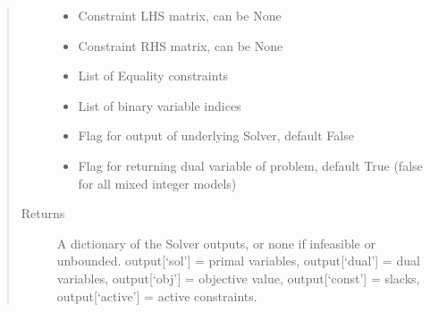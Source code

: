 \documentclass[letterpaper,10pt,english]{sphinxmanual}
\begin{document}
\begin{fulllineitems}
\begin{quote}
\begin{description}
\begin{itemize}
\item {} 
\sphinxAtStartPar
{} \textendash{} Constraint LHS matrix, can be None

\item {} 
\sphinxAtStartPar
{} \textendash{} Constraint RHS matrix, can be None

\item {} 
\sphinxAtStartPar
{} \textendash{} List of Equality constraints

\item {} 
\sphinxAtStartPar
{} \textendash{} List of binary variable indices

\item {} 
\sphinxAtStartPar
{} \textendash{} Flag for output of underlying Solver, default False

\item {} 
\sphinxAtStartPar
{} \textendash{} Flag for returning dual variable of problem, default True (false for all mixed integer models)

\end{itemize}

\item[{Returns}] \leavevmode
\sphinxAtStartPar
A dictionary of the Solver outputs, or none if infeasible or unbounded. output{[}‘sol’{]} = primal variables, output{[}‘dual’{]} = dual variables, output{[}‘obj’{]} = objective value, output{[}‘const’{]} = slacks, output{[}‘active’{]} = active constraints.

\end{description}\end{quote}

\end{fulllineitems}

\end{document}
